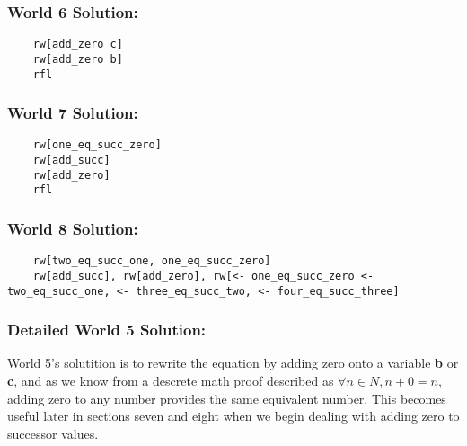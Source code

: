 \documentclass{article}
\theoremstyle{theorem}
\theoremstyle{definition}
\theoremstyle{remark}
\begin{document}
  \subsubsection*{World 6 Solution:}
  \begin{lstlisting}
    rw[add_zero c]
    rw[add_zero b]
    rfl
  \end{lstlisting}
  \subsubsection*{World 7 Solution:}
  \begin{lstlisting}
    rw[one_eq_succ_zero]
    rw[add_succ]
    rw[add_zero]
    rfl
  \end{lstlisting}
  \subsubsection*{World 8 Solution:}
  \begin{lstlisting}
    rw[two_eq_succ_one, one_eq_succ_zero]
    rw[add_succ], rw[add_zero], rw[<- one_eq_succ_zero <- two_eq_succ_one, <- three_eq_succ_two, <- four_eq_succ_three]
  \end{lstlisting}
  
 \subsubsection*{Detailed World 5 Solution:}
    World 5's solutition is to rewrite the equation by adding zero onto a variable \textbf{b} or \textbf{c}, and as we know from a descrete math proof described as $\forall n \in N,n+0=n$, adding zero to any number provides the same equivalent number. This becomes useful later in sections seven and eight when we begin dealing with adding zero to successor values. 
\end{document}
